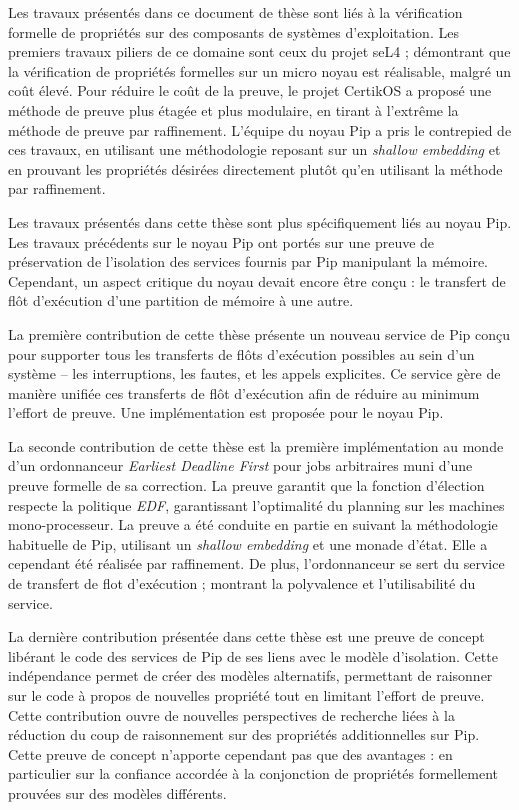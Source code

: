 
Les travaux présentés dans ce document de thèse sont liés à la vérification formelle de propriétés sur des composants de systèmes d'exploitation. Les premiers travaux piliers de ce domaine sont ceux du projet seL4 ; démontrant que la vérification de propriétés formelles sur un micro noyau est réalisable, malgré un coût élevé. Pour réduire le coût de la preuve, le projet CertikOS a proposé une méthode de preuve plus étagée et plus modulaire, en tirant à l'extrême la méthode de preuve par raffinement. L'équipe du noyau Pip a pris le contrepied de ces travaux, en utilisant une méthodologie reposant sur un \emph{shallow embedding} et en prouvant les propriétés désirées directement plutôt qu'en utilisant la méthode par raffinement.

Les travaux présentés dans cette thèse sont plus spécifiquement liés au noyau Pip. Les travaux précédents sur le noyau Pip ont portés sur une preuve de préservation de l'isolation des services fournis par Pip manipulant la mémoire. Cependant, un aspect critique du noyau devait encore être conçu : le transfert de flôt d'exécution d'une partition de mémoire à une autre.

La première contribution de cette thèse présente un nouveau service de Pip conçu pour supporter tous les transferts de flôts d'exécution possibles au sein d'un système -- les interruptions, les fautes, et les appels explicites. Ce service gère de manière unifiée ces transferts de flôt d'exécution afin de réduire au minimum l'effort de preuve. Une implémentation est proposée pour le noyau Pip.

La seconde contribution de cette thèse est la première implémentation au monde d'un ordonnanceur \emph{Earliest Deadline First} pour jobs arbitraires muni d'une preuve formelle de sa correction. La preuve garantit que la fonction d'élection respecte la politique \emph{EDF}, garantissant l'optimalité du planning sur les machines mono-processeur. La preuve a été conduite en partie en suivant la méthodologie habituelle de Pip, utilisant un \emph{shallow embedding} et une monade d'état. Elle a cependant été réalisée par raffinement. De plus, l'ordonnanceur se sert du service de transfert de flot d'exécution ; montrant la polyvalence et l'utilisabilité du service.

La dernière contribution présentée dans cette thèse est une preuve de concept libérant le code des services de Pip de ses liens avec le modèle d'isolation. Cette indépendance permet de créer des modèles alternatifs, permettant de raisonner sur le code à propos de nouvelles propriété tout en limitant l'effort de preuve. Cette contribution ouvre de nouvelles perspectives de recherche liées à la réduction du coup de raisonnement sur des propriétés additionnelles sur Pip. Cette preuve de concept n'apporte cependant pas que des avantages : en particulier sur la confiance accordée à la conjonction de propriétés formellement prouvées sur des modèles différents.
